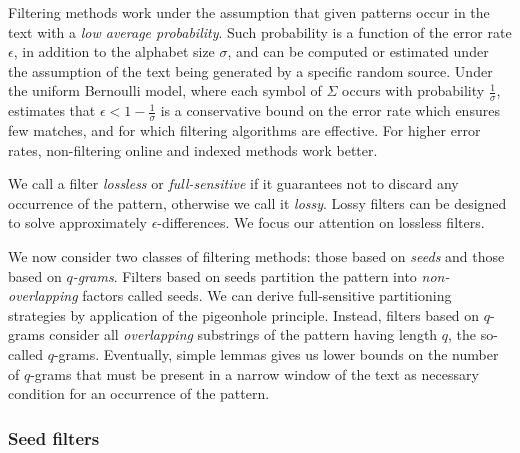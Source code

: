 Filtering methods work under the assumption that given patterns occur in the text with a \emph{low average probability}.
Such probability is a function of the error rate $\epsilon$, in addition to the alphabet size $\sigma$, and can be computed or estimated under the assumption of the text being generated by a specific random source.
Under the uniform Bernoulli model, where each symbol of $\Sigma$ occurs with probability $\frac{1}{\sigma}$, \citet{Navarro2000} estimates that $\epsilon < 1 - \frac{1}{\sigma}$ is a conservative bound on the error rate which ensures few matches, and for which filtering algorithms are effective.
For higher error rates, non-filtering online and indexed methods work better.

We call a filter \emph{lossless} or \emph{full-sensitive} if it guarantees not to discard any occurrence of the pattern, otherwise we call it \emph{lossy}.
Lossy filters can be designed to solve approximately $\epsilon$-differences.
We focus our attention on lossless filters. 

We now consider two classes of filtering methods: those based on \emph{seeds} and those based on \emph{$q$-grams}.
Filters based on seeds partition the pattern into \emph{non-overlapping} factors called seeds.
We can derive full-sensitive partitioning strategies by application of the pigeonhole principle.
Instead, filters based on $q$-grams consider all \emph{overlapping} substrings of the pattern having length $q$, the so-called $q$-grams.
Eventually, simple lemmas gives us lower bounds on the number of $q$-grams that must be present in a narrow window of the text as necessary condition for an occurrence of the pattern.

\subsubsection{Seed filters}

